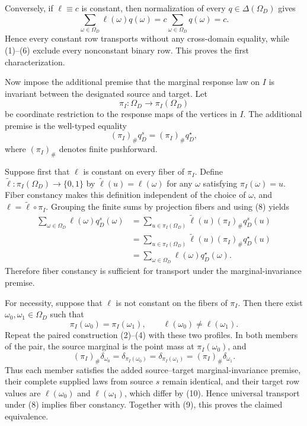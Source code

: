 Conversely, if \(\ell\equiv c\) is constant, then normalization of every \(q\in\Delta(\Omega_D)\) gives
\[
\sum_{\omega\in\Omega_D}\ell(\omega)q(\omega)
=c\sum_{\omega\in\Omega_D}q(\omega)
=c.
\tag{7}
\]
Hence every constant row transports without any cross-domain equality, while (1)--(6) exclude every nonconstant binary row.  This proves the first characterization.

Now impose the additional premise that the marginal response law on \(I\) is invariant between the designated source and target.  Let
\[
\pi_I:\Omega_D\longrightarrow\pi_I(\Omega_D)
\]
be coordinate restriction to the response maps of the vertices in \(I\).  The additional premise is the well-typed equality
\[
(\pi_I)_{\#}q_D^s=(\pi_I)_{\#}q_D^\star,
\tag{8}
\]
where \((\pi_I)_{\#}\) denotes finite pushforward.

Suppose first that \(\ell\) is constant on every fiber of \(\pi_I\).  Define \(\widetilde\ell:\pi_I(\Omega_D)\to\{0,1\}\) by \(\widetilde\ell(u)=\ell(\omega)\) for any \(\omega\) satisfying \(\pi_I(\omega)=u\).  Fiber constancy makes this definition independent of the choice of \(\omega\), and \(\ell=\widetilde\ell\circ\pi_I\).  Grouping the finite sums by projection fibers and using (8) yields
\[
\begin{aligned}
\sum_{\omega\in\Omega_D}\ell(\omega)q_D^s(\omega)
&=\sum_{u\in\pi_I(\Omega_D)}
  \widetilde\ell(u)(\pi_I)_{\#}q_D^s(u)\\
&=\sum_{u\in\pi_I(\Omega_D)}
  \widetilde\ell(u)(\pi_I)_{\#}q_D^\star(u)\\
&=\sum_{\omega\in\Omega_D}\ell(\omega)q_D^\star(\omega).
\end{aligned}
\tag{9}
\]
Therefore fiber constancy is sufficient for transport under the marginal-invariance premise.

For necessity, suppose that \(\ell\) is not constant on the fibers of \(\pi_I\).  Then there exist \(\omega_0,\omega_1\in\Omega_D\) such that
\[
\pi_I(\omega_0)=\pi_I(\omega_1),
\qquad
\ell(\omega_0)\ne\ell(\omega_1).
\tag{10}
\]
Repeat the paired construction (2)--(4) with these two profiles.  In both members of the pair, the source marginal is the point mass at \(\pi_I(\omega_0)\), and
\[
(\pi_I)_{\#}\delta_{\omega_0}
=\delta_{\pi_I(\omega_0)}
=\delta_{\pi_I(\omega_1)}
=(\pi_I)_{\#}\delta_{\omega_1}.
\tag{11}
\]
Thus each member satisfies the added source--target marginal-invariance premise, their complete supplied laws from source \(s\) remain identical, and their target row values are \(\ell(\omega_0)\) and \(\ell(\omega_1)\), which differ by (10).  Hence universal transport under (8) implies fiber constancy.  Together with (9), this proves the claimed equivalence.

